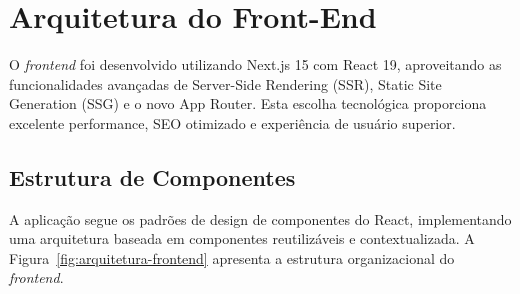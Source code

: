 \section{Arquitetura do Front-End}

O \textit{frontend} foi desenvolvido utilizando Next.js 15 com React 19, aproveitando as funcionalidades avançadas de Server-Side Rendering (SSR), Static Site Generation (SSG) e o novo App Router. Esta escolha tecnológica proporciona excelente performance, SEO otimizado e experiência de usuário superior.

\subsection{Estrutura de Componentes}

A aplicação segue os padrões de design de componentes do React, implementando uma arquitetura baseada em componentes reutilizáveis e contextualizada. A Figura~\ref{fig:arquitetura-frontend} apresenta a estrutura organizacional do \textit{frontend}.

